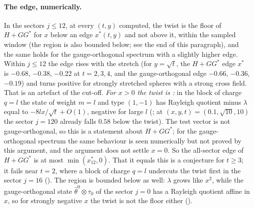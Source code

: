 \documentclass[11pt]{article}
\theoremstyle{definition}
\theoremstyle{remark}
\newif\ifredline
\newcommand{\redins}[1]{\ifredline{\color{blue}#1}\else#1\fi}
\newcommand{\reddel}[1]{\ifredline{\color{red}\sout{#1}}\fi}
\begin{document}
{\paragraph{The edge, numerically.} In the sectors $j\le12$, at every $(t,y)$ computed, the twist is the floor of
$H+GG^*$ for $x$ below an edge $x^*(t,y)$ and not above it\redins{, within the sampled window (the region is also
bounded below; see the end of this paragraph)}, and the same holds for the gauge-orthogonal spectrum
with a slightly higher edge. \reddel{For $y\gtrsim1$ the competitor that sets the edge is the block $B_{4,0}$, and $x^*$ is a
root of $P_2$ (to $10^{-8}$); at small $y$ it is a block of the sector $j=2$ or $3$.} Within $j\le12$ the edge rises with the stretch
(\redins{for $y=\sqrt t$, the $H+GG^*$ edge $x^*$ is $-0.68$, $-0.38$, $-0.22$ at $t=2,3,4$, and the gauge-orthogonal edge }$-0.66$, $-0.36$, $-0.19$\reddel{ at $t=2,3,4$ for $y=\sqrt t$}) and turns positive for strongly stretched spheres with a strong
cross field. That is an artefact of the cut-off. \emph{For $x>0$ the twist is \reddel{the floor of no field in every sector}:}
in the block of charge $q=l$ the state of weight $m=l$ and type $(1,-1)$ has Rayleigh quotient minus $\lambda$ equal to
$-8lx/\sqrt t+O(1)$, negative for large $l$ (; at $(x,y,t)=(0.1,\sqrt{10},10)$ the
sector $j=120$ already falls $0.58$ below the twist).\redins{ The test vector is not gauge-orthogonal, so this is a
statement about $H+GG^*$; for the gauge-orthogonal spectrum the same behaviour is seen numerically but not proved by
this argument, and the argument does not settle $x=0$.} So the all-sector edge \redins{of $H+GG^*$} is at most $\min(x^*_{12},0)$. That it equals
this is a conjecture for $t\ge3$; it fails near $t=2$, where a block of charge $q=l$ undercuts the twist first in the
sector $j=16$ (). The region is bounded below as well: $\lambda$ grows like $x^2$,
while the gauge-orthogonal state $\hat\theta^0\otimes\tau_0$ of the sector $j=0$ has a Rayleigh quotient affine in
$x$, so for strongly negative $x$ the twist is not the floor either ().
}
\end{document}
